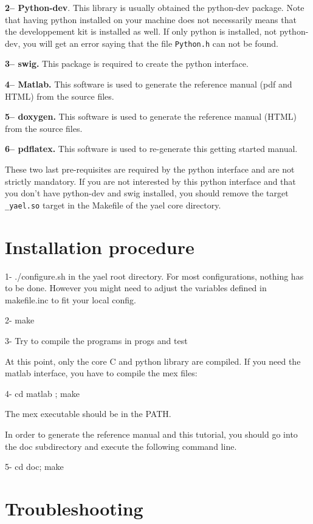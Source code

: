 \documentclass[a4paper,11pt,notitlepage,final,twoside]{report}
\begin{document}
{\bf 2-- Python-dev}. 
This library is usually obtained the python-dev package. 
Note that having python installed on your machine does not necessarily 
means that the developpement kit is installed as well. 
If only python is installed, not python-dev, you will get an error 
saying that the file \texttt{Python.h} can not be found. 
\bigskip

{\bf 3-- swig.} This package is required to create the python interface. 
\bigskip

{\bf 4-- Matlab.}
\smallskip
This software is used to generate the reference manual (pdf and HTML) from the source 
files. 
\bigskip

{\bf 5-- doxygen.}
\smallskip
This software is used to generate the reference manual (HTML) from the source 
files. 
\bigskip

{\bf 6-- pdflatex.}
\smallskip
This software is used to re-generate this getting started manual. 
\bigskip


These two last pre-requisites are required by the python interface 
and are not strictly mandatory. If you are not interested by this 
python interface and that you don't have python-dev and swig installed, 
you should remove the target \texttt{\_yael.so} target in the Makefile of the 
yael core directory. 


\section{Installation procedure}

1- ./configure.sh in the yael root directory. 
For most configurations, nothing has to be done. However you might need 
to adjust the variables defined in makefile.inc to fit your local config. 

2- make


3- Try to compile the programs in progs and test

At this point, only the core C and python library are compiled. 
If you need the matlab interface, you have to compile the mex files:

4- cd matlab ; make

The mex executable should be in the PATH. 


In order to generate the reference manual and this tutorial, you should go into the 
doc subdirectory and execute the following command line. 

5- cd doc; make


\section{Troubleshooting}
\end{document}
